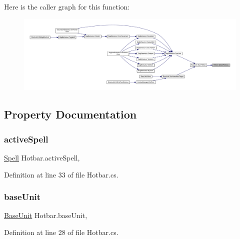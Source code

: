 Here is the caller graph for this function\+:
\nopagebreak
\begin{figure}[H]
\begin{center}
\leavevmode
\includegraphics[width=350pt]{class_hotbar_a1b1cab633f4bf2347af2c0f04fa4b856_icgraph}
\end{center}
\end{figure}


\subsection{Property Documentation}
\mbox{\label{class_hotbar_ab8c1abafc83f793590f0bf08981d50ef}} 
\subsubsection{\texorpdfstring{activeSpell}{activeSpell}}
{\footnotesize\ttfamily \mbox{\hyperlink{class_spell}{Spell}} Hotbar.\+active\+Spell\hspace{0.3cm}{\ttfamily [get]}, {\ttfamily [set]}}



Definition at line 33 of file Hotbar.\+cs.

\mbox{\label{class_hotbar_a4a0bb9b20e1c7c8df122470fd540768b}} 
\subsubsection{\texorpdfstring{baseUnit}{baseUnit}}
{\footnotesize\ttfamily \mbox{\hyperlink{class_base_unit}{Base\+Unit}} Hotbar.\+base\+Unit\hspace{0.3cm}{\ttfamily [get]}, {\ttfamily [set]}}



Definition at line 28 of file Hotbar.\+cs.

